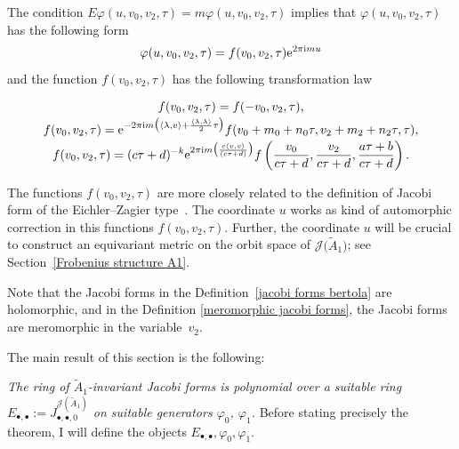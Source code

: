 \documentclass[pdftex]{sigma}%
\numberwithin{equation}{section}
\newcommand{\Ja}{\mathcal{J}}
\begin{document}
\begin{Remark}\label{Remark Zagier Ja1}
The condition $E\varphi(u,v_0,v_2,\tau)=m\varphi(u,v_0,v_2,\tau)$ implies that $\varphi(u,v_0,v_2,\tau)$ has the following form
\begin{gather*}
\varphi(u,v_0,v_2,\tau)=f(v_0,v_2,\tau){\rm e}^{2\pi {\rm i}m u}
\end{gather*}
and the function $f(v_0,v_2,\tau)$ has the following transformation law{\samepage
\begin{gather*}%
f(v_0,v_2,\tau)=f(-v_0,v_2,\tau),
\\[-.5ex]
f(v_0,v_2,\tau)={\rm e}^{-2\pi {\rm i} m\big(\langle \lambda,v \rangle +\frac{\langle\lambda,\lambda \rangle}{2}\tau\big)}f(v_0+m_0+n_0\tau,v_2+m_2+n_2\tau,\tau),
\\[-.5ex]
f(v_0,v_2,\tau)=(c\tau+d)^{-k}{\rm e}^{2\pi {\rm i}m\big(\frac{c\langle v,v \rangle}{(c\tau+d)}\big)}f\left(\frac{v_0}{c\tau+d},\frac{v_2}{c\tau+d},\frac{a\tau+b}{c\tau+d}\right).
\end{gather*}

}

\noindent
The functions $f(v_0,v_2,\tau)$ are more closely related to the definition of Jacobi form of the Eichler--Zagier type~\cite{M.EichlerandD.Zagier}. The coordinate $u$ works as kind of automorphic correction in this functions $f(v_0,v_2,\tau)$. Further, the coordinate $u$ will be crucial to construct an equivariant metric on the orbit space of $\Ja\big(\tilde A_1\big)$; see Section~\ref{Frobenius structure A1}.
\end{Remark}

\begin{Remark}
Note that the Jacobi forms in the Definition~\ref{jacobi forms bertola} are holomorphic, and in the Definition \ref{meromorphic jacobi forms}, the Jacobi forms are meromorphic in the variable~$v_2$.
\end{Remark}

The main result of this section is the following:

 \textit{The ring of $\tilde A_1$-invariant Jacobi forms is polynomial over a suitable ring $E_{\bullet,\bullet}:=J_{\bullet,\bullet,0}^{\Ja(\tilde A_1)}$ on suitable generators $\varphi_0$, $\varphi_1$.} Before stating precisely the theorem, I will define the objects $E_{\bullet,\bullet},\varphi_0,\varphi_1$.
\end{document}
